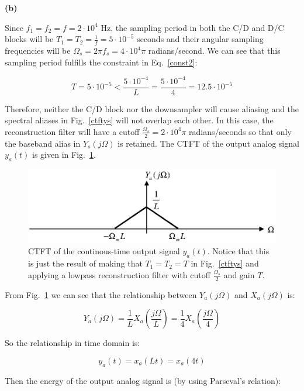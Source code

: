 \documentclass[a4paper,11pt,oneside]{article}
\begin{document}
\vspace{1cm}
\textbf{(b)}

Since $f_1=f_2=f=2\cdot 10^4$ Hz, the sampling period in both the C/D and D/C blocks will be $T_1=T_2=\frac{1}{f}=5\cdot 10^{-5}$ seconds and their angular sampling frequencies will be $\Omega_s=2\pi f_s=4\cdot 10^{4}\pi$ radians/second. We can see that this sampling period fulfills the constraint in Eq.~\ref{const2}:

\[
T=5\cdot 10^{-5}<\frac{5\cdot 10^{-4}}{L}=\frac{5\cdot 10^{-4}}{4}=12.5\cdot 10^{-5}
\]

Therefore, neither the C/D block nor the downsampler will cause aliasing and the spectral aliases in Fig.~\ref{ctftys} will not overlap each other. In this case, the reconstruction filter will have a cutoff $\frac{\Omega_s}{2}=2\cdot 10^{4}\pi$ radians/seconds so that only the baseband alias in $Y_s(j\Omega)$ is retained. The CTFT of the output analog signal $y_a(t)$ is given in Fig.~\ref{ctfty}. 

\begin{figure}[h!]
\centering
\includegraphics[width=.8\textwidth]{ctfty.eps}
\caption{CTFT of the continous-time output signal $y_a(t)$. Notice that this is just the result of making that $T_1=T_2=T$ in Fig.~\ref{ctftys} and applying a lowpass reconstruction filter with cutoff $\frac{\Omega_s}{2}$ and gain $T$.}
\label{ctfty}
\end{figure}

From Fig.~\ref{ctfty} we can see that the relationship between $Y_a(j\Omega)$ and $X_a(j\Omega)$ is:

\begin{equation}\label{relfreq}
Y_a(j\Omega) = \frac{1}{L}X_{a}(\frac{j\Omega}{L})=\frac{1}{4}X_{a}(\frac{j\Omega}{4})
\end{equation}

So the relationship in time domain is:

\begin{equation}
y_a(t)=x_a(Lt)=x_a(4t)
\end{equation}

Then the energy of the output analog signal is (by using Parseval's relation):
\end{document}
